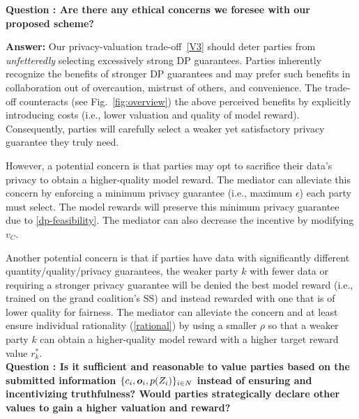 \documentclass{article}
\theoremstyle{plain}
\theoremstyle{definition}
\theoremstyle{remark}
\begin{document}


\textbf{Question : Are there any ethical concerns we foresee with our proposed scheme?}

\textbf{Answer:}
Our privacy-valuation trade-off~\eqref{V3} should deter parties from \emph{unfetteredly} selecting excessively strong DP guarantees.
Parties inherently recognize the benefits of stronger DP guarantees and may prefer such benefits in collaboration out of overcaution, mistrust of others, and convenience. The trade-off counteracts (see Fig.~\ref{fig:overview}) the above perceived benefits by explicitly introducing costs (i.e., lower valuation and quality of model reward). Consequently, parties will carefully select a weaker yet satisfactory privacy guarantee they truly need.

However, a potential concern is that parties may opt to sacrifice their data's privacy to obtain a higher-quality model reward. The mediator can alleviate this concern by enforcing a minimum privacy guarantee (i.e., maximum $\epsilon$) each party must select. The model rewards will preserve this minimum privacy guarantee due to \ref{dp-feasibility}. The mediator can also decrease the incentive by modifying $v_C$. %

Another potential concern is that if parties have data with significantly different quantity/quality/privacy guarantees, the weaker party $k$ with fewer data or requiring a stronger privacy guarantee will be denied the best model reward (i.e., trained on the grand coalition's SS) and instead rewarded with one that is of lower quality for fairness. The mediator can alleviate the concern and at least ensure individual rationality (\ref{rational}) by using a smaller $\rho$ so that a weaker party $k$ can obtain a higher-quality model reward with a higher target reward value $r^*_k$.\\

\textbf{Question : Is it sufficient and reasonable to value parties based on the submitted information $\{c_i, {\bm{o}}_i, p(Z_i) \}_{i \in N}$ instead of ensuring and incentivizing truthfulness? Would parties strategically declare other values to gain a higher valuation and reward?}
\end{document}
